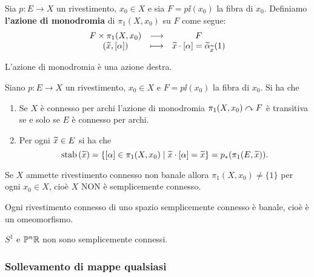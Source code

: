 \begin{multicols*}{2}
\begin{definition}
Sia $p:E\to X$ un rivestimento, $x_0\in X$ e sia $F=p\ii(x_0)$ la fibra di $x_0$. Definiamo \textbf{l'azione di monodromia} di $\pi_1(X,x_0)$ su $F$ come segue:
\[\begin{array}{ccc} {F\times\pi_1(X,x_0)} & \longrightarrow & {F}\\ {(\widetilde{x},[\alpha])} & \longmapsto & {\widetilde{x}\cdot[\alpha]=\widetilde{\alpha}_{\widetilde{x}}(1)} \end{array}\]
\end{definition}
\begin{proposition}
L'azione di monodromia è una azione destra.
\end{proposition}


\begin{theorem}\label{ProprietaAzioneMonodromia}
Siano $p:E\to X$ un rivestimento, $x_0\in X$ e  $F=p\ii(x_0)$ la fibra di $x_0$. Si ha che
\begin{enumerate}[noitemsep]
\item Se $X$ \`e connesso per archi l'azione di monodromia $\pi_1(X,x_0)\curvearrowright F$ è transitiva se e solo se $E$ è connesso per archi.
\item Per ogni $\widetilde{x}\in E$ si ha che
\[\mathrm{stab}\,(\widetilde{x})=\{[\alpha]\in\pi_1(X,x_0)\mid \widetilde{x}\cdot[\alpha]=\widetilde{x}\}=p_\ast(\pi_1(E,\widetilde{x})).\]
\end{enumerate}
\end{theorem}

\begin{corollary}
Se $X$ ammette rivestimento connesso non banale allora $\pi_1(X,x_0)\neq \{1\}$ per ogni $x_0\in X$, cioè $X$ NON è semplicemente connesso.
\end{corollary}
\begin{corollary}
Ogni rivestimento connesso di uno spazio semplicemente connesso è banale, cioè è un omeomorfismo.
\end{corollary}

\begin{corollary}
$S^1$ e $\mathbb{P}^n\mathbb{R}$ non sono semplicemente connessi.
\end{corollary}

\subsubsection{Sollevamento di mappe qualsiasi}


\end{multicols*}

